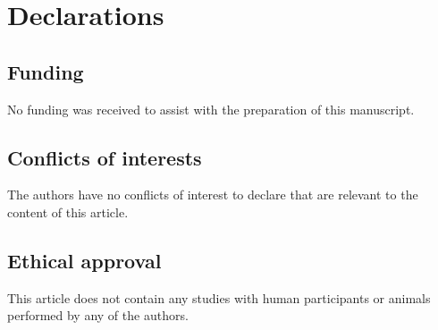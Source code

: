 \documentclass[3p]{elsarticle}
\begin{document}
\section*{Declarations}
\subsection*{Funding}
No funding was received to assist with the preparation of this manuscript.
\subsection*{Conflicts of interests}
The authors have no conflicts of interest to declare that are relevant to the content of this article.
\subsection*{Ethical approval}
This article does not contain any studies with human participants or animals performed by any of the authors.


\end{document}
